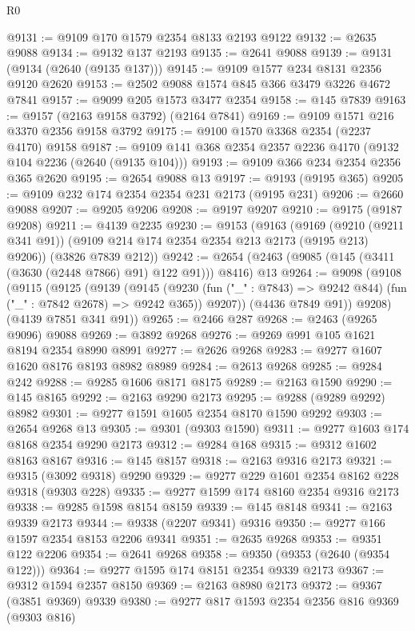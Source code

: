 \begin{lexlean}{R0}
\begin{coremodule}
@9131 := @9109 @170 @1579 @2354 @8133 @2193 @9122
@9132 := @2635 @9088
@9134 := @9132 @137 @2193
@9135 := @2641 @9088
@9139 := @9131 (@9134 (@2640 (@9135 @137)))
@9145 := @9109 @1577 @234 @8131 @2356 @9120 @2620
@9153 := @2502 @9088 @1574 @845 @366 @3479 @3226 @4672 @7841
@9157 := @9099 @205 @1573 @3477 @2354
@9158 := @145 @7839
@9163 := @9157 (@2163 @9158 @3792) (@2164 @7841)
@9169 := @9109 @1571 @216 @3370 @2356 @9158 @3792
@9175 := @9100 @1570 @3368 @2354 (@2237 @4170) @9158
@9187 := @9109 @141 @368 @2354 @2357 @2236 @4170 (@9132 @104 @2236 (@2640 (@9135 @104)))
@9193 := @9109 @366 @234 @2354 @2356 @365 @2620
@9195 := @2654 @9088 @13
@9197 := @9193 (@9195 @365)
@9205 := @9109 @232 @174 @2354 @2354 @231 @2173 (@9195 @231)
@9206 := @2660 @9088
@9207 := @9205 @9206
@9208 := @9197 @9207
@9210 := @9175 (@9187 @9208)
@9211 := @4139 @2235
@9230 := @9153
    (@9163
      (@9169 (@9210 (@9211 @341 @91)) (@9109 @214 @174 @2354 @2354 @213 @2173 (@9195 @213) @9206))
      (@3826 @7839 @212))
@9242 := @2654 (@2463 (@9085 (@145 (@3411 (@3630 (@2448 @7866) @91) @122 @91))) @8416) @13
@9264 := @9098
    (@9108
      (@9115
        (@9125
          (@9139
            (@9145
              (@9230 (fun ("_" : @7843) => @9242 @844) (fun ("_" : @7842 @2678) => @9242 @365))
              @9207))
          (@4436 @7849 @91))
        @9208)
      (@4139 @7851 @341 @91))
@9265 := @2466 @287
@9268 := @2463 (@9265 @9096) @9088
@9269 := @3892 @9268
@9276 := @9269 @991 @105 @1621 @8194 @2354 @8990 @8991
@9277 := @2626 @9268
@9283 := @9277 @1607 @1620 @8176 @8193 @8982 @8989
@9284 := @2613 @9268
@9285 := @9284 @242
@9288 := @9285 @1606 @8171 @8175
@9289 := @2163 @1590
@9290 := @145 @8165
@9292 := @2163 @9290 @2173
@9295 := @9288 (@9289 @9292) @8982
@9301 := @9277 @1591 @1605 @2354 @8170 @1590 @9292
@9303 := @2654 @9268 @13
@9305 := @9301 (@9303 @1590)
@9311 := @9277 @1603 @174 @8168 @2354 @9290 @2173
@9312 := @9284 @168
@9315 := @9312 @1602 @8163 @8167
@9316 := @145 @8157
@9318 := @2163 @9316 @2173
@9321 := @9315 (@3092 @9318) @9290
@9329 := @9277 @229 @1601 @2354 @8162 @228 @9318 (@9303 @228)
@9335 := @9277 @1599 @174 @8160 @2354 @9316 @2173
@9338 := @9285 @1598 @8154 @8159
@9339 := @145 @8148
@9341 := @2163 @9339 @2173
@9344 := @9338 (@2207 @9341) @9316
@9350 := @9277 @166 @1597 @2354 @8153 @2206 @9341
@9351 := @2635 @9268
@9353 := @9351 @122 @2206
@9354 := @2641 @9268
@9358 := @9350 (@9353 (@2640 (@9354 @122)))
@9364 := @9277 @1595 @174 @8151 @2354 @9339 @2173
@9367 := @9312 @1594 @2357 @8150
@9369 := @2163 @8980 @2173
@9372 := @9367 (@3851 @9369) @9339
@9380 := @9277 @817 @1593 @2354 @2356 @816 @9369 (@9303 @816)

\end{coremodule}
\end{lexlean}
